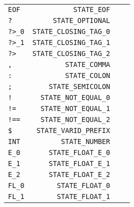 \documentclass[a4paper,12pt]{article}
\begin{document}
\begin{center}
\begin{tabular}{l r|l r}
		\verb|EOF|  & \; \verb|STATE_EOF|           \;   &                   &                                    \\
		\verb|?|    & \; \verb|STATE_OPTIONAL|      \;   &                   &                                    \\
		\verb|?>_0| & \verb|STATE_CLOSING_TAG_0|    \;   &                   &                                    \\
		\verb|?>_1| & \verb|STATE_CLOSING_TAG_1|    \;   &                   &                                    \\
		\verb|?>|   & \verb|STATE_CLOSING_TAG_2|    \;   &                   &                                    \\
		\verb|,|    & \verb|STATE_COMMA|            \;   &                   &                                    \\
		\verb|:|    & \verb|STATE_COLON|            \;   &                   &                                    \\
		\verb|;|    & \verb|STATE_SEMICOLON|       \;    &                   &                                    \\
		\verb|!|    & \verb|STATE_NOT_EQUAL_0|     \;    &                   &                                    \\
		\verb|!=|   & \verb|STATE_NOT_EQUAL_1|      \;   &                   &                                    \\
		\verb|!==|  & \verb|STATE_NOT_EQUAL_2|     \;    &                   &                                    \\
		\verb|$|    & \verb|STATE_VARID_PREFIX|    \;    &                   &                                    \\
		\verb|INT|  & \verb|STATE_NUMBER|           \;   &                   &                                    \\
		\verb|E_0|  & \verb|STATE_FLOAT_E_0|       \;    &                   &                                    \\
		\verb|E_1|  & \verb|STATE_FLOAT_E_1|       \;    &                   &                                    \\
		\verb|E_2|  & \verb|STATE_FLOAT_E_2|       \;    &                   &                                    \\
		\verb|FL_0| & \verb|STATE_FLOAT_0|        \;     &                   &                                    \\
		\verb|FL_1| & \verb|STATE_FLOAT_1|         \;    &                   &                                    \\
	\end{tabular}
\end{center}
\clearpage
\end{document}
